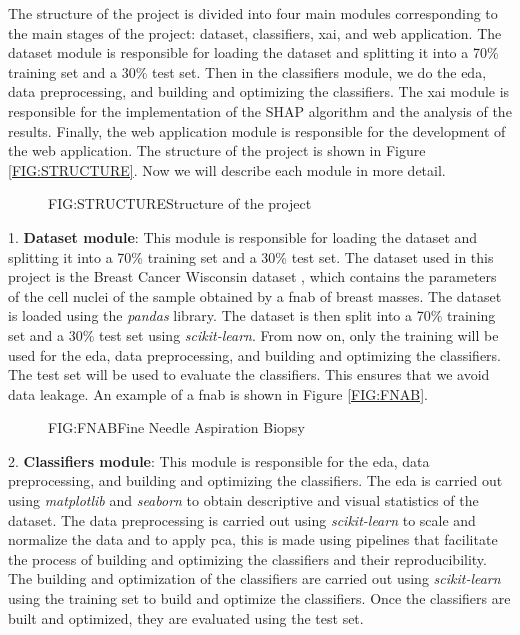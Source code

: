 
The structure of the project is divided into four main modules corresponding to the main stages of the project: dataset, classifiers, \ac{xai}, and web application. The dataset module is responsible for loading the dataset and splitting it into a 70\% training set and a 30\% test set. Then in the classifiers module, we do the \ac{eda}, data preprocessing, and building and optimizing the classifiers. The \ac{xai} module is responsible for the implementation of the SHAP algorithm and the analysis of the results. Finally, the web application module is responsible for the development of the web application. The structure of the project is shown in Figure \ref{FIG:STRUCTURE}. Now we will describe each module in more detail.

\begin{figure}[Structure of the project]{FIG:STRUCTURE}{Structure of the project}
\end{figure}

1. \textbf{Dataset module}: This module is responsible for loading the dataset and splitting it into a 70\% training set and a 30\% test set. The dataset used in this project is the Breast Cancer Wisconsin dataset \cite{william_wolberg_breast_1993}, which contains the parameters of the cell nuclei of the sample obtained by a \ac{fnab} of breast masses. The dataset is loaded using the \textit{pandas} library. The dataset is then split into a 70\% training set and a 30\% test set using \textit{scikit-learn}. From now on, only the training will be used for the \acl{eda}, data preprocessing, and building and optimizing the classifiers. The test set will be used to evaluate the classifiers. This ensures that we avoid data leakage. An example of a \ac{fnab} is shown in Figure \ref{FIG:FNAB}.

\begin{figure}[Fine Needle Aspiration Biopsy]{FIG:FNAB}{Fine Needle Aspiration Biopsy \cite{sidey-gibbons_machine_2019}}
\end{figure}

2. \textbf{Classifiers module}: This module is responsible for the \ac{eda}, data preprocessing, and building and optimizing the classifiers. The \ac{eda} is carried out using \textit{matplotlib} and \textit{seaborn} to obtain descriptive and visual statistics of the dataset. The data preprocessing is carried out using \textit{scikit-learn} to scale and normalize the data and to apply \ac{pca}, this is made using pipelines that facilitate the process of building and optimizing the classifiers and their reproducibility. The building and optimization of the classifiers are carried out using \textit{scikit-learn} using the training set to build and optimize the classifiers. Once the classifiers are built and optimized, they are evaluated using the test set.

